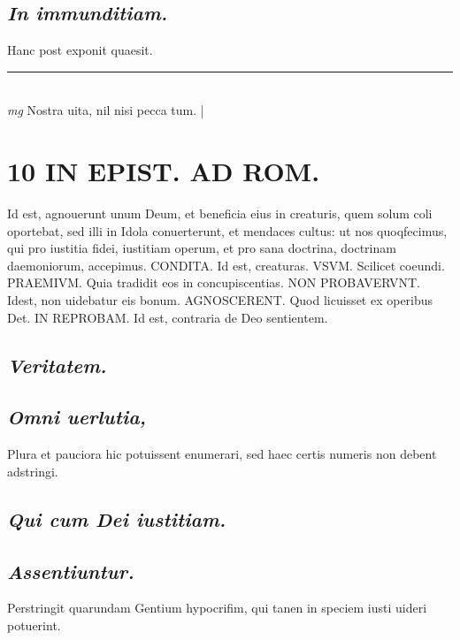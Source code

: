 \documentclass{article}
\begin{document}
\begin{pages}
\subsection*{\textit{In immunditiam. }}\pstart Hanc post exponit quaesit.   \pend
\vspace{0.5cm}\noindent
\vspace{0.2cm}\rule{1cm}{0.2pt}\\ 
\hspace{0.2cm}\textit{mg}
\footnotesize Nostra uita, nil nisi pecca tum. 
\normalsize| 
\section*{10 IN EPIST. AD ROM.  }
\marginpar{[ p.]}
\marginpar{[ p.]}\pstart Id est, agnouerunt unum Deum, et beneficia eius in creaturis, quem solum coli oportebat, sed illi in Idola conuerterunt, et mendaces cultus: ut nos quoqfecimus, qui pro iustitia fidei, iustitiam operum, et pro sana doctrina, doctrinam daemoniorum, accepimus. CONDITA. Id est, creaturas. VSVM. Scilicet coeundi. PRAEMIVM. Quia tradidit eos in concupiscentias. NON PROBAVERVNT. Idest, non uidebatur eis bonum. AGNOSCERENT. Quod licuisset ex operibus Det. IN REPROBAM.  Id est, contraria de Deo sentientem.   \pend
{}
{}
\subsection*{\textit{Veritatem. }}
{}
\subsection*{\textit{Omni uerlutia, }}\pstart Plura et pauciora hic potuissent enumerari, sed haec certis numeris non debent adstringi.  \pend
{}
{}
\subsection*{\textit{Qui cum Dei iustitiam. }}
{}
\subsection*{\textit{Assentiuntur. }}\pstart Perstringit quarundam Gentium hypocrifim, qui tanen in speciem iusti uideri potuerint.   \pend
{}
{}

\end{pages}
\end{document}
